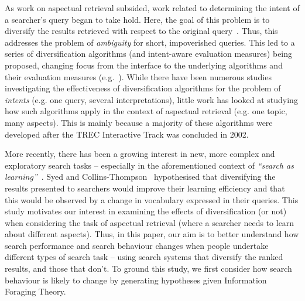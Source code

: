 
As work on aspectual retrieval subsided, work related to determining the intent of a searcher's query began to take hold. Here, the goal of this problem is to diversify the results retrieved with respect to the original query~\cite{rose2004understanding_user_goals}. Thus, this addresses the problem of \emph{ambiguity} for short, impoverished queries. This led to a series of diversification algorithms (and intent-aware evaluation measures) being proposed, changing focus from the interface to the underlying algorithms and their evaluation measures (e.g.~\cite{agrawal2009diversification,carbonell1998mmr,carterette2009probabalistic,chen2006lessismore,he2011diversification_clustering,radlinski2006diversification,santos2010query_reformulations_diversification,santos2011intent,zhai2015subtopics,zuccon2009qprp}). While there have been numerous studies investigating the effectiveness of diversification algorithms for the problem of \emph{intents} (e.g. one query, several interpretations), little work has looked at studying how such algorithms apply in the context of aspectual retrieval (e.g. one topic, many aspects). This is mainly because a majority of these algorithms were developed after the TREC Interactive Track was concluded in 2002.

More recently, there has been a growing interest in new, more complex and exploratory search tasks -- especially in the aforementioned context of \emph{``search as learning''}~\cite{collins2017sal}. Syed and Collins-Thompson~\cite{syed2017sal} hypothesised that diversifying the results presented to searchers would improve their learning efficiency and that this would be observed by a change in vocabulary expressed in their queries. This study motivates our interest in examining the effects of diversification (or not) when considering the task of aspectual retrieval (where a searcher needs to learn about different aspects). Thus, in this paper, our aim is to better understand how search performance and search behaviour changes when people undertake different types of search task -- using search systems that diversify the ranked results, and those that don't. To ground this study, we first consider how search behaviour is likely to change by generating hypotheses given Information Foraging Theory.


